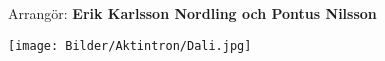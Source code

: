 \pagestyle{fotfil}
\vspace*{\fill}
\begin{center}{\large Arrangör: \textbf{Erik Karlsson Nordling och Pontus Nilsson}}\end{center}
\vfill
\begin{center}\texttt{[image: Bilder/Aktintron/Dali.jpg]}
\end{center}
\newpage
\begingroup\fontsize{11}{12}\selectfont %
\endgroup
\newpage
\begingroup\fontsize{11}{12}\selectfont
\endgroup
\newpage
\begingroup\fontsize{11}{12}\selectfont
{}
\endgroup
